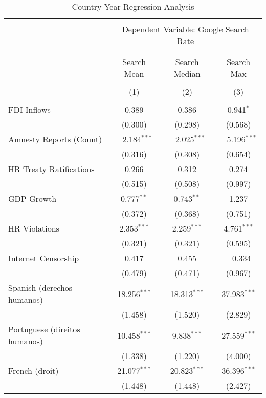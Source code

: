 
\begin{table}[!htbp] \centering 
  \caption{Country-Year Regression Analysis} 
  \label{} 
\begin{tabular}{@{\extracolsep{5pt}}lccc} 
\\[-1.8ex]\hline 
\hline \\[-1.8ex] 
 & \multicolumn{3}{c}{Dependent Variable: Google Search Rate} \\ 
\cline{2-4} 
\\[-1.8ex] & \multicolumn{3}{c}{ } \\ 
 & Search Mean & Search Median & Search Max \\ 
\\[-1.8ex] & (1) & (2) & (3)\\ 
\hline \\[-1.8ex] 
 FDI Inflows & 0.389 & 0.386 & 0.941$^{*}$ \\ 
  & (0.300) & (0.298) & (0.568) \\ 
  Amnesty Reports (Count) & $-$2.184$^{***}$ & $-$2.025$^{***}$ & $-$5.196$^{***}$ \\ 
  & (0.316) & (0.308) & (0.654) \\ 
  HR Treaty Ratifications & 0.266 & 0.312 & 0.274 \\ 
  & (0.515) & (0.508) & (0.997) \\ 
  GDP Growth & 0.777$^{**}$ & 0.743$^{**}$ & 1.237 \\ 
  & (0.372) & (0.368) & (0.751) \\ 
  HR Violations & 2.353$^{***}$ & 2.259$^{***}$ & 4.761$^{***}$ \\ 
  & (0.321) & (0.321) & (0.595) \\ 
  Internet Censorship & 0.417 & 0.455 & $-$0.334 \\ 
  & (0.479) & (0.471) & (0.967) \\ 
  Spanish (derechos humanos) & 18.256$^{***}$ & 18.313$^{***}$ & 37.983$^{***}$ \\ 
  & (1.458) & (1.520) & (2.829) \\ 
  Portuguese (direitos humanos) & 10.458$^{***}$ & 9.838$^{***}$ & 27.559$^{***}$ \\ 
  & (1.338) & (1.220) & (4.000) \\ 
  French (droit) & 21.077$^{***}$ & 20.823$^{***}$ & 36.396$^{***}$ \\ 
  & (1.448) & (1.448) & (2.427) \\ 

\end{tabular}
\end{table}
